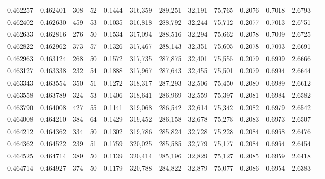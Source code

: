 \begin{tabular}{rrrrrrrrrrrrr}
0.462257 & 0.462401 &   308 &  52 &                                     0.1444 & 316,359 & 289,251 &  32,191 &  75,765 & 0.2076 & 0.7018 & 2.6793 \\
0.462402 & 0.462630 &   459 &  53 &                                     0.1035 & 316,818 & 288,792 &  32,244 &  75,712 & 0.2077 & 0.7013 & 2.6751 \\
0.462633 & 0.462816 &   276 &  50 &                                     0.1534 & 317,094 & 288,516 &  32,294 &  75,662 & 0.2078 & 0.7009 & 2.6725 \\
0.462822 & 0.462962 &   373 &  57 &                                     0.1326 & 317,467 & 288,143 &  32,351 &  75,605 & 0.2078 & 0.7003 & 2.6691 \\
0.462963 & 0.463124 &   268 &  50 &                                     0.1572 & 317,735 & 287,875 &  32,401 &  75,555 & 0.2079 & 0.6999 & 2.6666 \\
0.463127 & 0.463338 &   232 &  54 &                                     0.1888 & 317,967 & 287,643 &  32,455 &  75,501 & 0.2079 & 0.6994 & 2.6644 \\
0.463343 & 0.463554 &   350 &  51 &                                     0.1272 & 318,317 & 287,293 &  32,506 &  75,450 & 0.2080 & 0.6989 & 2.6612 \\
0.463558 & 0.463789 &   324 &  53 &                                     0.1406 & 318,641 & 286,969 &  32,559 &  75,397 & 0.2081 & 0.6984 & 2.6582 \\
0.463790 & 0.464008 &   427 &  55 &                                     0.1141 & 319,068 & 286,542 &  32,614 &  75,342 & 0.2082 & 0.6979 & 2.6542 \\
0.464008 & 0.464210 &   384 &  64 &                                     0.1429 & 319,452 & 286,158 &  32,678 &  75,278 & 0.2083 & 0.6973 & 2.6507 \\
0.464212 & 0.464362 &   334 &  50 &                                     0.1302 & 319,786 & 285,824 &  32,728 &  75,228 & 0.2084 & 0.6968 & 2.6476 \\
0.464362 & 0.464522 &   239 &  51 &                                     0.1759 & 320,025 & 285,585 &  32,779 &  75,177 & 0.2084 & 0.6964 & 2.6454 \\
0.464525 & 0.464714 &   389 &  50 &                                     0.1139 & 320,414 & 285,196 &  32,829 &  75,127 & 0.2085 & 0.6959 & 2.6418 \\
0.464714 & 0.464927 &   374 &  50 &                                     0.1179 & 320,788 & 284,822 &  32,879 &  75,077 & 0.2086 & 0.6954 & 2.6383 \\

\end{tabular}
